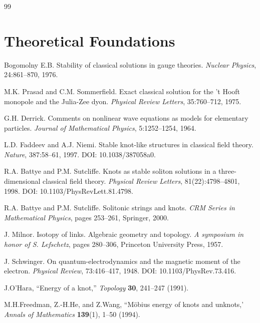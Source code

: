 \documentclass[11pt,a4paper]{article}
\begin{document}
\begin{thebibliography}{99}
	
	\section*{Theoretical Foundations}
	
	Bogomolny E.B.
	\newblock Stability of classical solutions in gauge theories.
	\newblock \textit{Nuclear Physics}, 24:861--870, 1976.
	
	M.K. Prasad and C.M. Sommerfield.
	\newblock Exact classical solution for the 't Hooft monopole and the Julia-Zee dyon.
	\newblock \textit{Physical Review Letters}, 35:760--712, 1975.
	
	G.H. Derrick.
	\newblock Comments on nonlinear wave equations as models for elementary particles.
	\newblock \textit{Journal of Mathematical Physics}, 5:1252--1254, 1964.
	
	L.D. Faddeev and A.J. Niemi.
	\newblock Stable knot-like structures in classical field theory.
	\newblock \textit{Nature}, 387:58--61, 1997.
	\newblock DOI: 10.1038/387058a0.
	
	R.A. Battye and P.M. Sutcliffe.
	\newblock Knots as stable soliton solutions in a three-dimensional classical field theory.
	\newblock \textit{Physical Review Letters}, 81(22):4798--4801, 1998.
	\newblock DOI: 10.1103/PhysRevLett.81.4798.
	
	R.A. Battye and P.M. Sutcliffe.
	\newblock Solitonic strings and knots.
	\newblock \textit{CRM Series in Mathematical Physics}, pages 253--261, Springer, 2000.
	
	J. Milnor.
	\newblock Isotopy of links. Algebraic geometry and topology.
	\newblock \textit{A symposium in honor of S. Lefschetz}, pages 280--306, Princeton University Press, 1957.
	
	J. Schwinger.
	\newblock On quantum-electrodynamics and the magnetic moment of the electron.
	\newblock \textit{Physical Review}, 73:416--417, 1948.
	\newblock DOI: 10.1103/PhysRev.73.416.
	
	 J.O'Hara, ``Energy of a knot,''
	\textit{Topology}
	\textbf{30}, 241--247 (1991).

	 M.H.Freedman, Z.-H.He, and Z.Wang, ``Möbius energy of knots and unknots,'
	\textit{Annals of Mathematics}
	\textbf{139}(1), 1--50 (1994).


\end{thebibliography}
\end{document}
